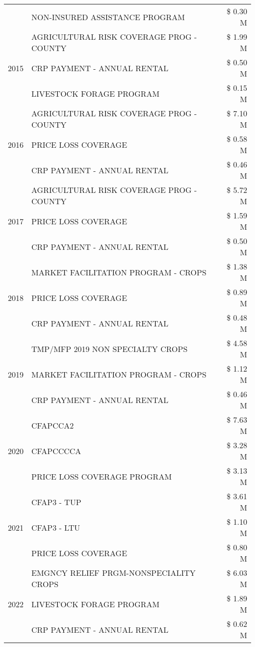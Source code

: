 \begin{tabular}{llr}
 & NON-INSURED ASSISTANCE PROGRAM & \$ 0.30 M \\
\cline{1-3}
\multirow[t]{3}{*}{2015} & AGRICULTURAL RISK COVERAGE PROG - COUNTY & \$ 1.99 M \\
 & CRP PAYMENT - ANNUAL RENTAL & \$ 0.50 M \\
 & LIVESTOCK FORAGE PROGRAM & \$ 0.15 M \\
\cline{1-3}
\multirow[t]{3}{*}{2016} & AGRICULTURAL RISK COVERAGE PROG - COUNTY & \$ 7.10 M \\
 & PRICE LOSS COVERAGE & \$ 0.58 M \\
 & CRP PAYMENT - ANNUAL RENTAL & \$ 0.46 M \\
\cline{1-3}
\multirow[t]{3}{*}{2017} & AGRICULTURAL RISK COVERAGE PROG - COUNTY & \$ 5.72 M \\
 & PRICE LOSS COVERAGE & \$ 1.59 M \\
 & CRP PAYMENT - ANNUAL RENTAL & \$ 0.50 M \\
\cline{1-3}
\multirow[t]{3}{*}{2018} & MARKET FACILITATION PROGRAM - CROPS & \$ 1.38 M \\
 & PRICE LOSS COVERAGE & \$ 0.89 M \\
 & CRP PAYMENT - ANNUAL RENTAL & \$ 0.48 M \\
\cline{1-3}
\multirow[t]{3}{*}{2019} & TMP/MFP 2019 NON SPECIALTY CROPS & \$ 4.58 M \\
 & MARKET FACILITATION PROGRAM - CROPS & \$ 1.12 M \\
 & CRP PAYMENT - ANNUAL RENTAL & \$ 0.46 M \\
\cline{1-3}
\multirow[t]{3}{*}{2020} & CFAPCCA2 & \$ 7.63 M \\
 & CFAPCCCCA & \$ 3.28 M \\
 & PRICE LOSS COVERAGE PROGRAM & \$ 3.13 M \\
\cline{1-3}
\multirow[t]{3}{*}{2021} & CFAP3 - TUP & \$ 3.61 M \\
 & CFAP3 - LTU & \$ 1.10 M \\
 & PRICE LOSS COVERAGE & \$ 0.80 M \\
\cline{1-3}
\multirow[t]{3}{*}{2022} & EMGNCY RELIEF PRGM-NONSPECIALITY CROPS & \$ 6.03 M \\
 & LIVESTOCK FORAGE PROGRAM & \$ 1.89 M \\
 & CRP PAYMENT - ANNUAL RENTAL & \$ 0.62 M \\
\cline{1-3}
\bottomrule
\end{tabular}
